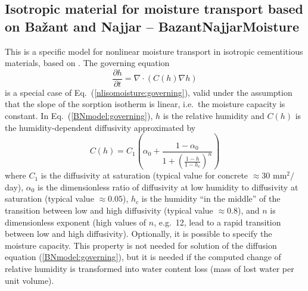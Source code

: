 \documentclass[a4paper]{article}
\newcommand{\refeq}[1]{Eq.~(\ref{#1})}
\begin{document}
\subsection{Isotropic material for moisture transport based on Ba\v{z}ant
  and Najjar -- BazantNajjarMoisture}
\label{sec:BazantNajjarMoistureMat}
This is a specific model for nonlinear moisture transport in isotropic cementitious
materials, based on \cite{Bazant:72}.
The governing equation 
\begin{equation}\label{BNmodel:governing}
\frac{\partial h}{\partial t} = \nabla \cdot \left( C(h) \nabla h \right)
\end{equation} 
is a special case of \refeq{nlisomoisture:governing}, valid under
the assumption that the slope of the sorption isotherm is linear, i.e.\ the
moisture capacity is constant.
In \refeq{BNmodel:governing}, $h$ is the relative humidity and $C(h)$ is the
humidity-dependent diffusivity approximated by
\begin{equation}\label{BNmodel:diffusivity}
C (h) = C_1 \left( \alpha_0
+ \frac{1-\alpha_0}{1+\left(\frac{1-h}{1-h_c}\right)^n} \right)
\end{equation}
where $C_1$ is the diffusivity at saturation (typical value for concrete
$\approx 30$ mm$^2/$day), $\alpha_0$ is the dimensionless ratio of
diffusivity at low humidity to diffusivity at saturation (typical
value $\approx 0.05$), $h_c$ is the humidity ``in the middle'' of the
transition between low and high diffusivity (typical value $\approx 0.8$), and $n$ is dimensionless
exponent (high values of $n$, e.g.\ 12, lead to a rapid transition
between low and high diffusivity). Optionally, it is possible to
specify the moisture capacity. This property is not needed for solution
of the diffusion equation  (\ref{BNmodel:governing}),
but it is needed if the computed change of relative humidity is transformed     
into water content loss (mass of lost water per unit volume).
\end{document}
